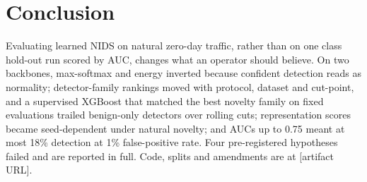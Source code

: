 \documentclass[conference]{IEEEtran}
\begin{document}
\section{Conclusion}
Evaluating learned NIDS on natural zero-day traffic, rather than on one class hold-out run scored by AUC, changes what an operator should believe. On two backbones, max-softmax and energy inverted because confident detection reads as normality; detector-family rankings moved with protocol, dataset and cut-point, and a supervised XGBoost that matched the best novelty family on fixed evaluations trailed benign-only detectors over rolling cuts; representation scores became seed-dependent under natural novelty; and AUCs up to 0.75 meant at most 18\% detection at 1\% false-positive rate. Four pre-registered hypotheses failed and are reported in full. Code, splits and amendments are at [artifact URL].
\end{document}
